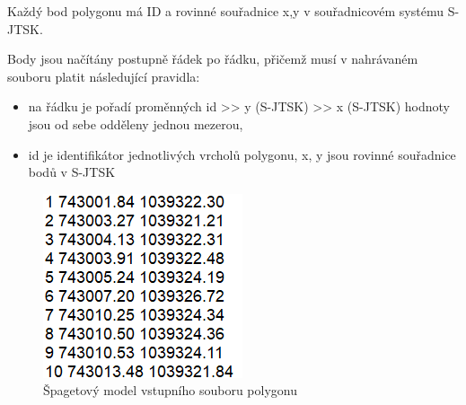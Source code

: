 \documentclass[11pt]{article}
\begin{document}
Každý bod polygonu má ID a rovinné souřadnice x,y v souřadnicovém systému S-JTSK.

Body jsou načítány postupně řádek po řádku, přičemž musí v nahrávaném souboru platit následující pravidla:    

\begin{itemize}
\item na řádku je pořadí proměnných id >> y (S-JTSK) >> x (S-JTSK)  hodnoty jsou od sebe odděleny  jednou mezerou,
\item id je identifikátor jednotlivých vrcholů polygonu, x, y jsou rovinné souřadnice bodů v S-JTSK
\end{itemize}

\begin{figure}[htbh]
	\centering	
	\includegraphics[scale=0.9]{images/vstup_polygon.png} 
	\caption{Špagetový model vstupního souboru polygonu}	\label{fig:vstup_polygon}
\end{figure} 

\end{document}
